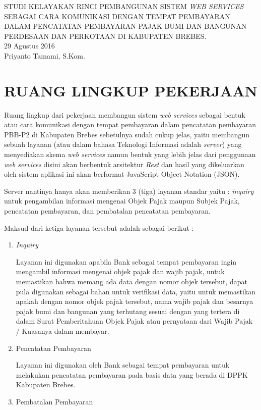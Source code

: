 \documentclass[pdftex,12pt, oneside]{article}
\begin{document}
\sloppy %

\begin{center}
{\large STUDI KELAYAKAN RINCI PEMBANGUNAN SISTEM \textit{WEB SERVICES} SEBAGAI CARA KOMUNIKASI DENGAN TEMPAT PEMBAYARAN DALAM PENCATATAN PEMBAYARAN PAJAK BUMI DAN BANGUNAN PERDESAAN DAN PERKOTAAN DI KABUPATEN BREBES.}
\\[1cm]
29 Agustus 2016\\
Priyanto Tamami, S.Kom.
\end{center}




\section{RUANG LINGKUP PEKERJAAN}

Ruang lingkup dari pekerjaan membangun sistem \textit{web services} sebagai bentuk atau cara komunikasi dengan tempat pembayaran dalam pencatatan pembayaran PBB-P2 di Kabupaten Brebes sebetulnya sudah cukup jelas, yaitu membangun sebuah layanan (atau dalam bahasa Teknologi Informasi adalah \textit{server}) yang menyediakan skema \textit{web services} namun bentuk yang lebih jelas dari penggunaan \textit{web services} disini akan berbentuk arsitektur \textit{Rest} dan hasil yang dikeluarkan oleh sistem aplikasi ini akan berformat JavaScript Object Notation (JSON).

Server nantinya hanya akan memberikan 3 (tiga) layanan standar yaitu : \textit{inquiry} untuk pengambilan informasi mengenai Objek Pajak maupun Subjek Pajak, pencatatan pembayaran, dan pembatalan pencatatan pembayaran.

Maksud dari ketiga layanan tersebut adalah sebagai berikut :

\begin{enumerate}
  \item \textit{Inquiry}
  
  Layanan ini digunakan apabila Bank sebagai tempat pembayaran ingin mengambil informasi mengenai objek pajak dan wajib pajak, untuk memastikan bahwa memang ada data dengan nomor objek tersebut, dapat pula digunakan sebagai bahan untuk verifikasi data, yaitu untuk memastikan apakah dengan nomor objek pajak tersebut, nama wajib pajak dan besarnya pajak bumi dan bangunan yang terhutang sesuai dengan yang tertera di dalam Surat Pemberitahuan Objek Pajak atau pernyataan dari Wajib Pajak / Kuasanya dalam membayar.
  
  \item Pencatatan Pembayaran
  
  Layanan ini digunakan oleh Bank sebagai tempat pembayaran untuk melakukan pencatatan pembayaran pada basis data yang berada di DPPK Kabupaten Brebes.
  
  \item Pembatalan Pembayaran
\end{enumerate}
\end{document}
